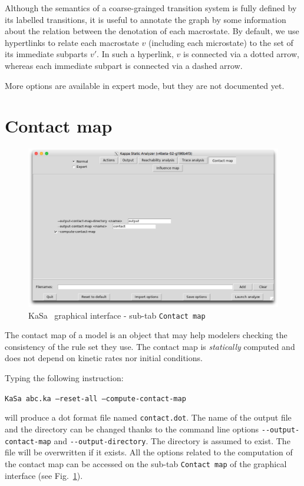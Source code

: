 \documentclass[11pt]{book}
\def\KaSa{\textsf{KaSa}}
\begin{document}
Although the semantics of a coarse-grainged transition system is fully defined  by its labelled transitions, it is useful to annotate the graph by some information about the relation between the denotation of each macrostate. By default, we use hypertlinks to relate each macrostate $v$ (including each microstate)
 to the set of its immediate subparts $v'$. In such a hyperlink, $v$ is connected via a dotted arrow, whereas each immediate subpart is connected via a dashed arrow.

 More options are available in expert mode, but they are not documented yet.

\section{Contact map}

\begin{figure}[htbp]
\centering
\includegraphics[width=12cm,bb=0 0 1904 1208]{img/kasa_4.png}
\caption{\KaSa~ graphical interface - sub-tab \texttt{Contact map}}
\label{fig:kasa:4}
\end{figure}

The contact map of a model is an object that may help modelers checking the consistency of the rule set they use. The contact map is \emph{statically} computed and does not depend on kinetic rates nor initial conditions.


Typing the following instruction:

\texttt{KaSa abc.ka --reset-all --compute-contact-map}

will produce a dot format file named \texttt{contact.dot}.
The name of the output file and the directory can be changed thanks to the command line options \texttt{-{}-output-contact-map} and \texttt{-{}-output-directory}.
The directory is assumed to exist. The file will be overwritten if it exists. All the options related to the computation of the contact map can be accessed on the
sub-tab \texttt{Contact map} of the graphical interface (see Fig.~\ref{fig:kasa:4}).
\end{document}
